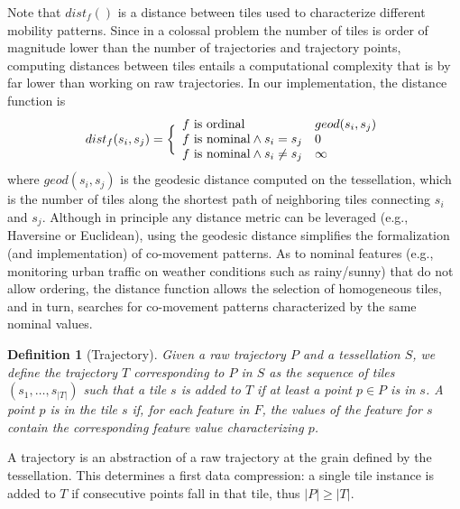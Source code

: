 \documentclass[preprint,12pt,authoryear]{elsarticle} %
\newtheorem{definition}{Definition}
\begin{document}
Note that $dist_f()$ is a distance between tiles used to characterize different mobility patterns.
Since in a colossal problem the number of tiles is  order of magnitude lower than the number of trajectories and trajectory points, computing distances between tiles entails a computational complexity that is by far lower than working on raw trajectories.
In our implementation, the distance function is
\begin{equation}
dist_f(s_i,s_j) =
\bigg \{
\begin{array}{ll}
f \textup{ is ordinal}  & geod(s_i,s_j) \\
f \textup{ is nominal} \wedge s_i = s_j & 0 \\
f \textup{ is nominal} \wedge s_i \neq s_j & \infty \\
\end{array}
\end{equation}
%
where $geod(s_i,s_j)$ is the geodesic distance \citep{bouttier2003geodesic} computed on the tessellation, which is the number of tiles along the shortest path of neighboring tiles connecting $s_i$ and $s_j$.
Although in principle any distance metric can be leveraged (e.g., Haversine or Euclidean), using the geodesic distance simplifies the formalization (and implementation) of co-movement patterns.
As to nominal features (e.g., monitoring urban traffic on weather conditions such as rainy/sunny) that do not allow ordering, the distance function allows the selection of homogeneous tiles, and in turn, searches for co-movement patterns characterized by the same nominal values.

\begin{definition}[Trajectory] 
\label{def:tes}
Given a raw trajectory $P$ and a tessellation $S$, we define the \textit{trajectory} $T$ corresponding to $P$ in $S$ as the sequence of tiles $(s_{1}, \ldots, s_{|T|})$ such that a tile $s$ is added to $T$ if at least a point $p \in P$ is in $s$.
A point $p$ \textit{is in} the tile $s$ if, for each feature in $F$, the values of the feature for $s$ contain the corresponding feature value characterizing $p$.
\end{definition}

A trajectory is an abstraction of a raw trajectory at the grain defined by the tessellation.
This determines a first data compression: a single tile instance is added to $T$ if consecutive points fall in that tile, thus $|P| \geq |T|$.
\end{document}
